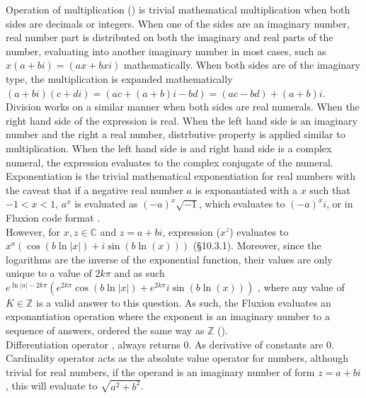 \documentclass[11pt,a4paper]{book}
\begin{document}
Operation of multiplication (\code{*}) is trivial mathematical multiplication when both sides are decimals or integers. When one of the sides are an imaginary number, real number part is distributed on both the imaginary and real parts of the number, evaluating into another imaginary number in most cases, such as $x(a + bi) = (ax + bxi)$ mathematically. When both sides are of the imaginary type, the multiplication is expanded mathematically $(a + bi)(c + di) = (ac + (a + b)i - bd) = (ac - bd) + (a + b)i$.\\

Division \code{/} works on a similar manner when both sides are real numerals. When the right hand side of the expression is real. When the left hand side is an imaginary number and the right a real number, distrbutive property is applied similar to multiplication. When the left hand side is  and right hand side is a complex numeral, the expression evaluates to the complex conjugate of the numeral.\\

Exponentiation \code{\^} is the trivial mathematical exponentiation for real numbers with the caveat that if a negative real number $a$ is exponantiated with a $x$ such that $-1 < x < 1$, $a^x$ is evaluated as $(-a)^x\sqrt{-1}$, which evaluates to $(-a)^xi$, or in Fluxion code format . \\

However, for $x, z \in \mathbb{C}$ and $z = a + bi$, expression  ($x^z$) evaluates to $x^a(\cos(b\ln|x|) + i\sin{(b\ln(x))})$ (\S 10.3.1). Moreover, since the logarithms are the inverse of the exponential function, their values are only unique to a value of $2k\pi$ and as such $e^{\ln{|a|} - 2k\pi}(e^{2k\pi}\cos(b\ln|x|) + e^{2k\pi}i\sin{(b\ln(x))})$  \cite{stack}, where any value of $K \in \mathbb{Z}$ is a valid answer to this question. As such, the Fluxion evaluates an exponantiation operation where the exponent is an imaginary number to a sequence of answers, ordered the same way as $\mathbb{Z}$ (). \\

Differentiation operator , always returns 0. As derivative of constants are 0. \\

Cardinality operator \code{||} acts as the absolute value operator for numbers, although trivial for real numbers, if the operand is an imaginary number of form $z = a + bi$, this  will evaluate to $\sqrt{a^2 + b^2}$. \\
\end{document}

